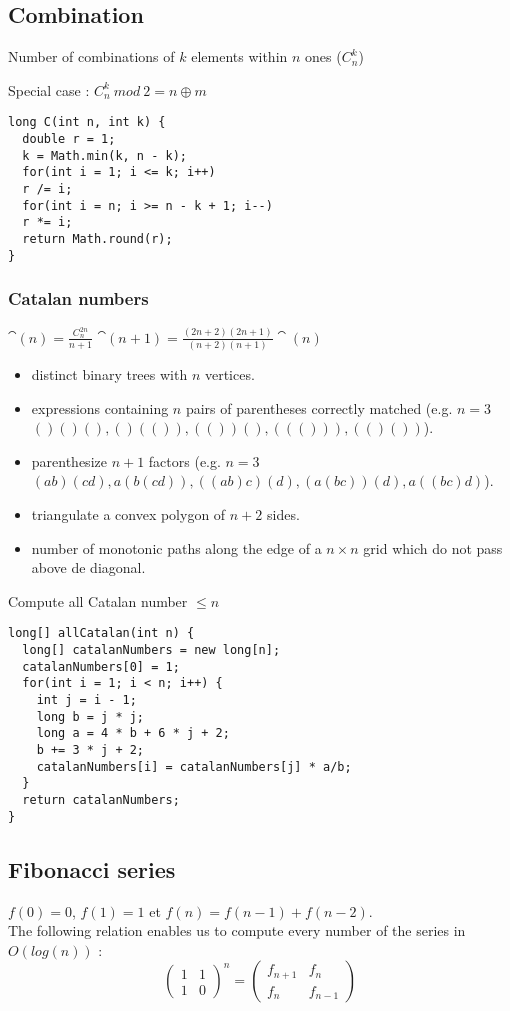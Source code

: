 \subsection{Combination}
Number of combinations of $k$ elements within $n$ ones ($C^k_n$)

Special case : $C^k_n\ mod\ 2 = n\oplus m$
\begin{lstlisting}
long C(int n, int k) {
  double r = 1;
  k = Math.min(k, n - k);
  for(int i = 1; i <= k; i++)
  r /= i;
  for(int i = n; i >= n - k + 1; i--)
  r *= i;
  return Math.round(r);
}
\end{lstlisting}

\subsubsection{Catalan numbers}
$\cat(n) = \frac{C_n^{2n}}{n+1}$ $\cat(n+1) = \frac{(2n+2)(2n+1)}{(n+2)(n+1)}\cat(n)$
\begin{itemize}
  \item distinct binary trees with $n$ vertices.
  \item expressions containing $n$ pairs of parentheses correctly matched (e.g. $n=3$ $()()(),()(()),(())(),((())),(()())$).
  \item parenthesize $n+1$ factors (e.g. $n=3$ $(ab)(cd),a(b(cd)),((ab)c)(d),(a(bc))(d),a((bc)d)$).
  \item triangulate a convex polygon of $n+2$ sides.
  \item number of monotonic paths along the edge of a $n\times n$ grid which do not pass above de diagonal.
\end{itemize}

Compute all Catalan number $\leq n$
\begin{lstlisting}
long[] allCatalan(int n) {
  long[] catalanNumbers = new long[n];
  catalanNumbers[0] = 1;
  for(int i = 1; i < n; i++) {
    int j = i - 1;
    long b = j * j;
    long a = 4 * b + 6 * j + 2;
    b += 3 * j + 2;
    catalanNumbers[i] = catalanNumbers[j] * a/b;
  }
  return catalanNumbers;
}
\end{lstlisting}


\subsection{Fibonacci series}
$f(0) = 0$, $f(1) = 1$ et $f(n) = f(n - 1) + f(n - 2)$.\\
The following relation enables us to compute every number of the series in $O(log(n))$ :\\
$$\begin{pmatrix}
1 & 1\\
1 & 0
\end{pmatrix}^n=\begin{pmatrix}
f_{n+1} & f_n\\
f_n & f_{n-1}
\end{pmatrix}$$

